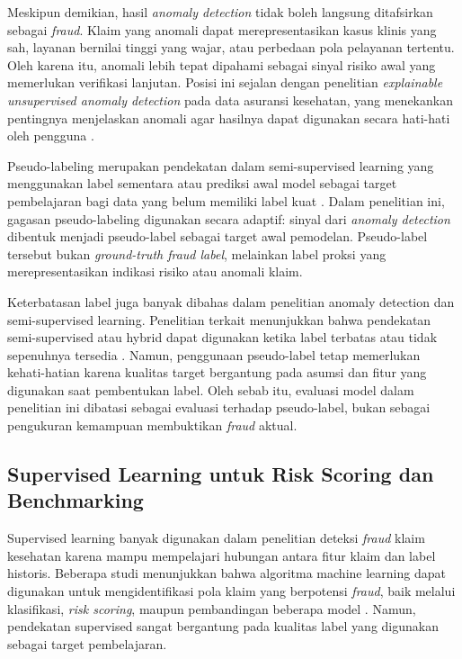 Meskipun demikian, hasil \emph{anomaly detection} tidak boleh langsung ditafsirkan sebagai \emph{fraud}. Klaim yang anomali dapat merepresentasikan kasus klinis yang sah, layanan bernilai tinggi yang wajar, atau perbedaan pola pelayanan tertentu. Oleh karena itu, anomali lebih tepat dipahami sebagai sinyal risiko awal yang memerlukan verifikasi lanjutan. Posisi ini sejalan dengan penelitian \emph{explainable unsupervised anomaly detection} pada data asuransi kesehatan, yang menekankan pentingnya menjelaskan anomali agar hasilnya dapat digunakan secara hati-hati oleh pengguna \citep{meulemeester2025}.

Pseudo-labeling merupakan pendekatan dalam semi-supervised learning yang menggunakan label sementara atau prediksi awal model sebagai target pembelajaran bagi data yang belum memiliki label kuat \citep{lee2013}. Dalam penelitian ini, gagasan pseudo-labeling digunakan secara adaptif: sinyal dari \emph{anomaly detection} dibentuk menjadi pseudo-label sebagai target awal pemodelan. Pseudo-label tersebut bukan \emph{ground-truth fraud label}, melainkan label proksi yang merepresentasikan indikasi risiko atau anomali klaim.

Keterbatasan label juga banyak dibahas dalam penelitian anomaly detection dan semi-supervised learning. Penelitian terkait menunjukkan bahwa pendekatan semi-supervised atau hybrid dapat digunakan ketika label terbatas atau tidak sepenuhnya tersedia \citep{yoon2022,bakker2025}. Namun, penggunaan pseudo-label tetap memerlukan kehati-hatian karena kualitas target bergantung pada asumsi dan fitur yang digunakan saat pembentukan label. Oleh sebab itu, evaluasi model dalam penelitian ini dibatasi sebagai evaluasi terhadap pseudo-label, bukan sebagai pengukuran kemampuan membuktikan \emph{fraud} aktual.

\subsection{Supervised Learning untuk Risk Scoring dan Benchmarking}\label{supervised-learning-untuk-risk-scoring-dan-benchmarking}

Supervised learning banyak digunakan dalam penelitian deteksi \emph{fraud} klaim kesehatan karena mampu mempelajari hubungan antara fitur klaim dan label historis. Beberapa studi menunjukkan bahwa algoritma machine learning dapat digunakan untuk mengidentifikasi pola klaim yang berpotensi \emph{fraud}, baik melalui klasifikasi, \emph{risk scoring}, maupun pembandingan beberapa model \citep{nabrawi2023,hamid2024,curtis2025}. Namun, pendekatan supervised sangat bergantung pada kualitas label yang digunakan sebagai target pembelajaran.

